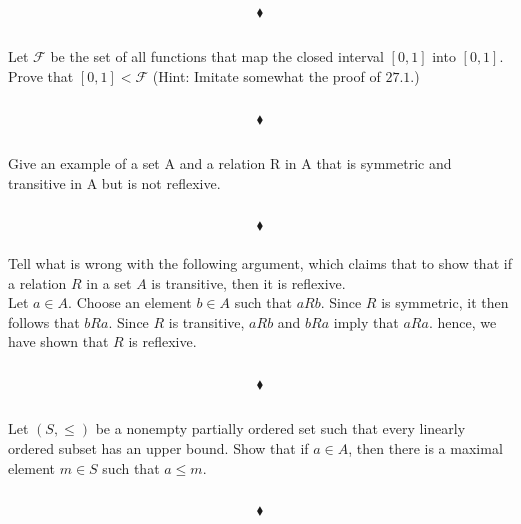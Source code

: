 $$\blacklozenge$$


\renewcommand{\thesubsection}{\thesection.\RomanNumeralCaps{12}}
\subsection{}
\begin{tcolorbox}
Let $\mathscr{F}$ be the set of all functions that map the closed interval $[0, 1]$ into $[0, 1]$. Prove that $[0,1] < \mathscr{F}$ (Hint: Imitate somewhat the proof of $\mathbf{27.1}$.) 
\end{tcolorbox}
$$ $$

$$\blacklozenge$$

\renewcommand{\thesubsection}{\thesection.\RomanNumeralCaps{13}}
\subsection{}
\subsubsection{}
\begin{tcolorbox}
Give an example of a set A and a relation R in A that is symmetric and transitive in A but is not reflexive. 
\end{tcolorbox}
$$ $$

$$\blacklozenge$$

\subsubsection{}
\begin{tcolorbox}
Tell what is wrong with the following argument, which claims that to show that if a relation $R$ in a set $A$ is transitive, then it is reflexive.
\\
Let $a\in A$. Choose an element $b\in A$ such that $aRb$. Since $R$ is symmetric, it then follows that $bRa$. Since $R$ is transitive, $aRb$ and $bRa$ imply that $aRa$. hence, we have shown that $R$ is reflexive.
\end{tcolorbox}
$$ $$

$$\blacklozenge$$

\renewcommand{\thesubsection}{\thesection.\RomanNumeralCaps{14}}
\subsection{}
\begin{tcolorbox}
Let $(S,\leq )$ be a nonempty partially ordered set such that every linearly ordered subset has an upper bound. Show that if $a\in A$, then there is a maximal element $m\in S$ such that $a\leq m$. 
\end{tcolorbox}
$$ $$

$$\blacklozenge$$
